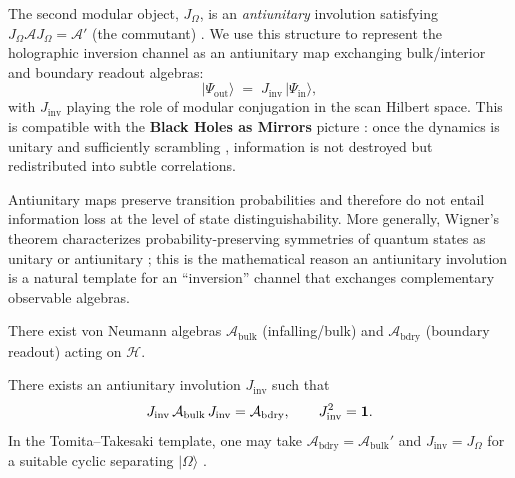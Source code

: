 The second modular object, $J_\Omega$, is an \emph{antiunitary} involution satisfying $J_\Omega \mathcal{A} J_\Omega = \mathcal{A}'$ (the commutant) \cite{Takesaki2002}. We use this structure to represent the holographic inversion channel as an antiunitary map exchanging bulk/interior and boundary readout algebras:
\begin{equation}
  |\Psi_{\mathrm{out}}\rangle \;=\; J_{\mathrm{inv}}\,|\Psi_{\mathrm{in}}\rangle ,
\end{equation}
with $J_{\mathrm{inv}}$ playing the role of modular conjugation in the scan Hilbert space. This is compatible with the \textbf{Black Holes as Mirrors} picture \cite{HaydenPreskill2007}: once the dynamics is unitary and sufficiently scrambling \cite{SekinoSusskind2008}, information is not destroyed but redistributed into subtle correlations.

\begin{remark}
Antiunitary maps preserve transition probabilities and therefore do not entail information loss at the level of state distinguishability. More generally, Wigner's theorem characterizes probability-preserving symmetries of quantum states as unitary or antiunitary \cite{Wigner1959}; this is the mathematical reason an antiunitary involution is a natural template for an ``inversion'' channel that exchanges complementary observable algebras.
\end{remark}

\begin{axiom}
\label{ax:algebraic_inversion}
\mbox{}\par
There exist von Neumann algebras $\mathcal{A}_{\mathrm{bulk}}$ (infalling/bulk) and $\mathcal{A}_{\mathrm{bdry}}$ (boundary readout) acting on $\mathcal{H}$.
\par
There exists an antiunitary involution $J_{\mathrm{inv}}$ such that
\begin{equation}
  J_{\mathrm{inv}}\,\mathcal{A}_{\mathrm{bulk}}\,J_{\mathrm{inv}}=\mathcal{A}_{\mathrm{bdry}},
  \qquad J_{\mathrm{inv}}^2=\mathbf{1}.
\end{equation}
In the Tomita--Takesaki template, one may take $\mathcal{A}_{\mathrm{bdry}}=\mathcal{A}_{\mathrm{bulk}}'$ and $J_{\mathrm{inv}}=J_\Omega$ for a suitable cyclic separating $|\Omega\rangle$ \cite{Takesaki2002}.
\end{axiom}

